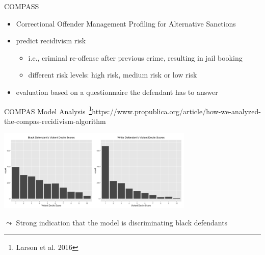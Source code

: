 \documentclass[11pt,compress,t,notes=noshow, xcolor=table]{beamer}
\begin{document}
\begin{vbframe}{COMPASS}

    \begin{itemize}
        \item Correctional Offender Management Profiling for Alternative Sanctions 
        \item predict recidivism risk
        \begin{itemize}
            \item i.e., criminal re-offense after previous crime, resulting in jail booking
            \item different risk levels: high risk, medium risk or low risk
        \end{itemize}
        \item evaluation based on a questionnaire the defendant has to answer
    \end{itemize}	
	
\end{vbframe}

\begin{vbframe}{COMPAS Model Analysis~\footnote{Larson et al. 2016}{https://www.propublica.org/article/how-we-analyzed-the-compas-recidivism-algorithm}}
    
    \centering
    \includegraphics[width=0.7\textwidth]{figure/compass_black_white.PNG}
	
	$\leadsto$ Strong indication that the model is discriminating black defendants
	
\end{vbframe}
\end{document}
